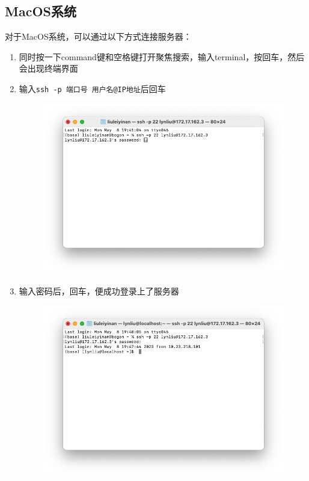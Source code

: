\documentclass{article}
\begin{document}
\subsection{MacOS系统}
对于MacOS系统，可以通过以下方式连接服务器：
\begin{enumerate}
    \item 同时按一下command键和空格键打开聚焦搜索，输入terminal，按回车，然后会出现终端界面
    \item 输入\quad \verb|ssh -p 端口号 用户名@IP地址|\quad 后回车
    \begin{figure}[H]
        \centering
        \includegraphics[scale = 0.5]{figs/1.png}
    \end{figure}
    \item 输入密码后，回车，便成功登录上了服务器
    \begin{figure}[H]
        \centering
        \includegraphics[scale = 0.5]{figs/2.png}
    \end{figure}
\end{enumerate}
\end{document}

